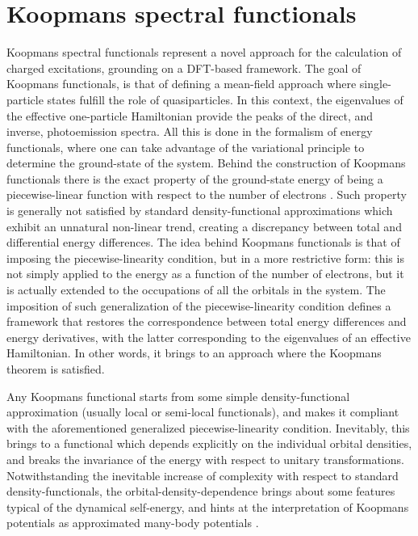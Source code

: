 \section{Koopmans spectral functionals\label{sec:intro-koopmans}}
Koopmans spectral functionals represent a novel approach for the calculation of charged excitations, grounding on a DFT-based framework. The goal of Koopmans functionals, is that of defining a mean-field approach where single-particle states fulfill the role of quasiparticles. In this context, the eigenvalues of the effective one-particle Hamiltonian provide the peaks of the direct, and inverse, photoemission spectra. All this is done in the formalism of energy functionals, where one can take advantage of the variational principle to determine the ground-state of the system. Behind the construction of Koopmans functionals there is the exact property of the ground-state energy of being a piecewise-linear function with respect to the number of electrons \cite{perdew_density-functional_1982}. Such property is generally not satisfied by standard density-functional approximations which exhibit an unnatural non-linear trend, creating a discrepancy between total and differential energy differences. The idea behind Koopmans functionals is that of imposing the piecewise-linearity condition, but in a more restrictive form: this is not simply applied to the energy as a function of the number of electrons, but it is actually extended to the occupations of all the orbitals in the system. The imposition of such generalization of the piecewise-linearity condition defines a framework that restores the correspondence between total energy differences and energy derivatives, with the latter corresponding to the eigenvalues of an effective Hamiltonian. In other words, it brings to an approach where the Koopmans theorem \cite{koopmans_uber_1934} is satisfied.

Any Koopmans functional starts from some simple density-functional approximation (usually local or semi-local functionals), and makes it compliant with the aforementioned generalized piecewise-linearity condition. Inevitably, this brings to a functional which depends explicitly on the individual orbital densities, and breaks the invariance of the energy with respect to unitary transformations. Notwithstanding the inevitable increase of complexity with respect to standard density-functionals, the orbital-density-dependence brings about some features typical of the dynamical self-energy, and hints at the interpretation of Koopmans potentials as approximated many-body potentials \cite{ferretti_bridging_2014}.

